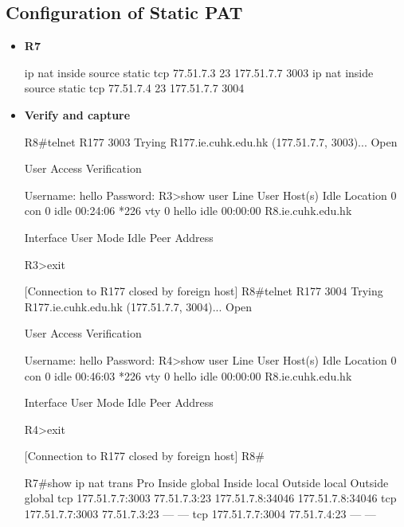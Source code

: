 \documentclass[10pt]{article}
\begin{document}
\subsection{Configuration of Static PAT}
\begin{itemize}
\item {\bf R7}
\begin{verbatim*}
ip nat inside source static tcp 77.51.7.3 23 177.51.7.7 3003 
ip nat inside source static tcp 77.51.7.4 23 177.51.7.7 3004
\end{verbatim*}
\item {\bf Verify and capture}
\begin{verbatim*}
R8#telnet R177 3003
Trying R177.ie.cuhk.edu.hk (177.51.7.7, 3003)... Open


User Access Verification

Username: hello
Password:
R3>show user
Line       User       Host(s)              Idle       Location
0 con 0                idle                 00:24:06
*226 vty 0     hello      idle                 00:00:00 R8.ie.cuhk.edu.hk

Interface    User               Mode         Idle     Peer Address

R3>exit

[Connection to R177 closed by foreign host]
R8#telnet R177 3004
Trying R177.ie.cuhk.edu.hk (177.51.7.7, 3004)... Open


User Access Verification

Username: hello
Password:
R4>show user
Line       User       Host(s)              Idle       Location
0 con 0                idle                 00:46:03
*226 vty 0     hello      idle                 00:00:00 R8.ie.cuhk.edu.hk

Interface    User               Mode         Idle     Peer Address

R4>exit

[Connection to R177 closed by foreign host]
R8#

R7#show ip nat trans
Pro Inside global      Inside local       Outside local      Outside global
tcp 177.51.7.7:3003    77.51.7.3:23       177.51.7.8:34046   177.51.7.8:34046
tcp 177.51.7.7:3003    77.51.7.3:23       ---                ---
tcp 177.51.7.7:3004    77.51.7.4:23       ---                ---
\end{verbatim*}
\end{itemize}
\end{document}
